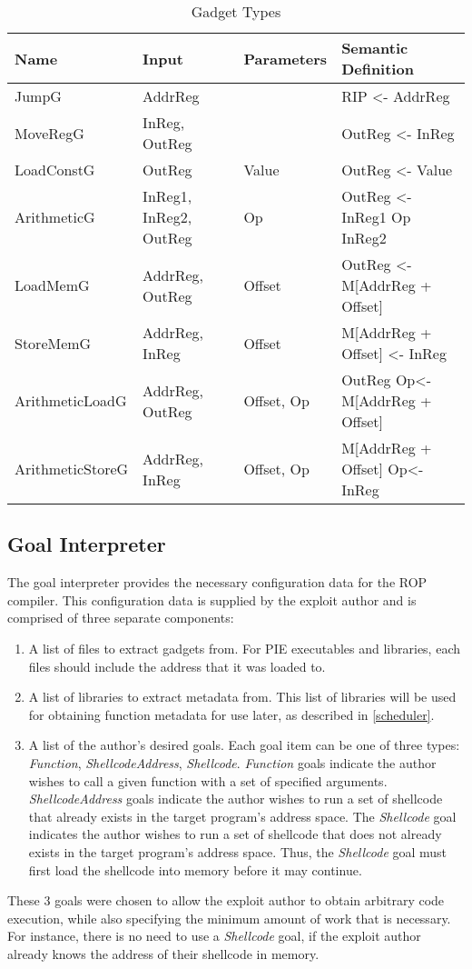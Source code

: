 \documentclass[journal]{IEEEtran}
\begin{document}
\begin{table*}
    \centering
    \begin{tabular}{ | l | l | l | l | }
    \hline
    Name & Input & Parameters & Semantic Definition \\
    \hline
    JumpG & AddrReg & & RIP <- AddrReg \\
    MoveRegG & InReg, OutReg & & OutReg <- InReg \\
    LoadConstG & OutReg & Value & OutReg <- Value \\
    ArithmeticG & InReg1, InReg2, OutReg & Op & OutReg <- InReg1 Op InReg2 \\
    LoadMemG & AddrReg, OutReg & Offset & OutReg <- M[AddrReg + Offset] \\
    StoreMemG & AddrReg, InReg & Offset & M[AddrReg + Offset] <- InReg \\
    ArithmeticLoadG & AddrReg, OutReg & Offset, Op & OutReg Op<-  M[AddrReg + Offset] \\
    ArithmeticStoreG & AddrReg, InReg & Offset, Op & M[AddrReg + Offset] Op<- InReg \\

      \hline
    \end{tabular}
    \label{tab:gadgetTypes}
    \caption{Gadget Types}
\end{table*}

\subsection{Goal Interpreter}
The goal interpreter provides the necessary configuration data for the ROP compiler.
This configuration data is supplied by the exploit author and is comprised of three separate components:
\begin{enumerate}
  \item A list of files to extract gadgets from.  For PIE executables and libraries, each files should include the address that it was loaded to.
  \item A list of libraries to extract metadata from.  This list of libraries will be used for obtaining function metadata for use later, as described in \ref{scheduler}.
  \item A list of the author's desired goals.  Each goal item can be one of three types: \emph{Function}, \emph{ShellcodeAddress}, \emph{Shellcode}.
  \emph{Function} goals indicate the author wishes to call a given function with a set of specified arguments.  
  \emph{ShellcodeAddress} goals indicate the author wishes to run a set of shellcode that already exists in the target program's address space.
  The \emph{Shellcode} goal indicates the author wishes to run a set of shellcode that does not already exists in the target program's address space.
  Thus, the \emph{Shellcode} goal must first load the shellcode into memory before it may continue.
\end{enumerate}
These 3 goals were chosen to allow the exploit author to obtain arbitrary code execution, while also specifying the minimum amount of work that is necessary.
For instance, there is no need to use a \emph{Shellcode} goal, if the exploit author already knows the address of their shellcode in memory.
\end{document}

